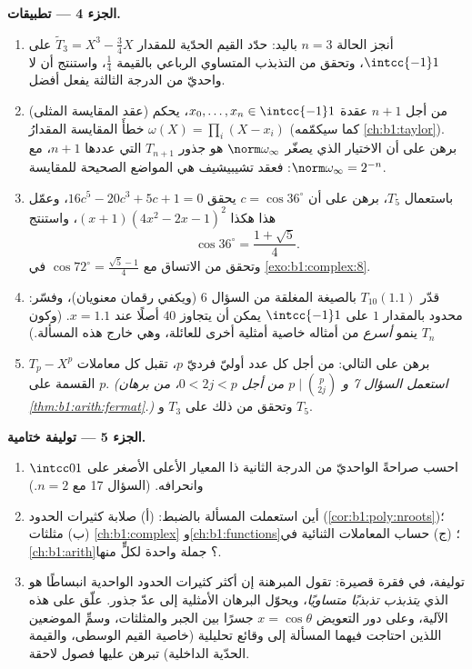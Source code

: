 \begin{problem}
\medskip
\noindent\textbf{الجزء 4 --- تطبيقات.}
\begin{enumerate}[resume]
  \item أنجز الحالة $n = 3$ باليد: حدّد القيم الحدّية للمقدار $\widetilde T_3 = X^3 - \frac34X$ على $\intcc{-1}1$،
        وتحقق من التذبذب المتساوي الرباعي بالقيمة
        $\frac14$، واستنتج أن لا  واحديّ من الدرجة الثالثة يفعل أفضل.
  \item (عقد المقايسة المثلى) من أجل $n + 1$ عقدة $x_0,
        \dots, x_n \in \intcc{-1}1$، يحكم خطأَ المقايسة المقدارُ $\omega(X) = \prod_i (X - x_i)$ (كما سيكمّمه
        \cref{ch:b1:taylor}). برهن على أن الاختيار
        الذي يصغّر $\norm\omega_\infty$ هو  جذور $T_{n+1}$
        التي عددها $n + 1$، مع $\norm\omega_\infty = 2^{-n}$:
        فعقد تشيبيشيف هي المواضع الصحيحة للمقايسة.
  \item باستعمال $T_5$، برهن على أن $c = \cos 36^\circ$ يحقق
        $16c^5 - 20c^3 + 5c + 1 = 0$، وعمّل  هذا هكذا
        $(x + 1)(4x^2 - 2x - 1)^2$، واستنتج
        \[
        \cos 36^\circ = \frac{1 + \sqrt5}4 .
        \]
        وتحقق من الاتساق مع $\cos 72^\circ =
        \frac{\sqrt5 - 1}4$ في \cref{exo:b1:complex:8}.
  \item قدّر $T_{10}(1.1)$ بالصيغة المغلقة من السؤال 6
        (ويكفي رقمان معنويان)، وفسّر: 
        محدود بالمقدار $1$ على $\intcc{-1}1$ يمكن أن يتجاوز
        $40$ أصلًا عند $x = 1.1$. (وكون $T_n$ ينمو
        \emph{أسرع} من أمثاله خاصية أمثلية أخرى
        للعائلة، وهي خارج هذه المسألة.)
  \item برهن على  التالي: من أجل كل عدد أوليّ فرديّ $p$، تقبل كل
        معاملات $T_p - X^p$ القسمة على $p$.
        \emph{(استعمل السؤال 7 و $p \mid \binom p{2j}$ من أجل $0 <
        2j < p$، من برهان
        \cref{thm:b1:arith:fermat}.)} وتحقق من ذلك على $T_3$ و $T_5$.
\end{enumerate}

\medskip
\noindent\textbf{الجزء 5 --- توليفة ختامية.}
\begin{enumerate}[resume]
  \item احسب صراحةً  الواحديّ من الدرجة الثانية ذا المعيار
        الأعلى الأصغر على $\intcc01$ وانحرافه. (السؤال 17
        مع $n = 2$.)
  \item أين استعملت المسألة بالضبط: (أ) صلابة
        كثيرات الحدود (\cref{cor:b1:poly:nroots})؛ (ب) مثلثات
        \cref{ch:b1:complex} و\cref{ch:b1:functions}؛ (ج) حساب المعاملات
        الثنائية في \cref{ch:b1:arith}؟ جملة واحدة لكلٍّ منها.
  \item توليفة، في فقرة قصيرة: تقول المبرهنة إن
        أكثر كثيرات الحدود الواحدية انبساطًا هو الذي
        \emph{يتذبذب تذبذبًا متساويًا}، ويحوّل البرهان الأمثلية
        إلى عدّ جذور. علّق على هذه الآلية، وعلى
        دور التعويض $x = \cos\theta$ جسرًا
        بين الجبر والمثلثات، وسمِّ الموضعين
        اللذين احتاجت فيهما المسألة إلى وقائع تحليلية (خاصية القيم الوسطى،
        والقيمة الحدّية الداخلية) تبرهن عليها فصول لاحقة.
\end{enumerate}
\end{problem}

